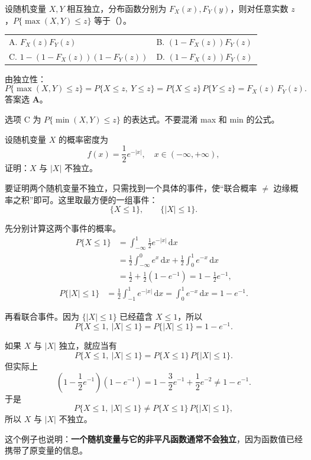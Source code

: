 ﻿\documentclass[lang=cn,11pt]{elegantbook}
\begin{document}
\begin{exercise}[独立性选择题] \label{exer:3-12d}
设随机变量 $X, Y$ 相互独立，分布函数分别为 $F_X(x), F_Y(y)$，则对任意实数 $z$，$P\{\max(X,Y) \leqslant z\}$ 等于（\quad）。\\
\begin{tabular}{ll}
A. $F_X(z)F_Y(z)$ & B. $(1-F_X(z))F_Y(z)$ \\
C. $1-(1-F_X(z))(1-F_Y(z))$ & D. $(1-F_X(z))F_Y(z)$
\end{tabular}
\end{exercise}
\begin{solution}
由独立性：
\[
P\{\max(X,Y) \leqslant z\} = P\{X \leqslant z,\ Y \leqslant z\} = P\{X \leqslant z\}\,P\{Y \leqslant z\} = F_X(z)\,F_Y(z).
\]
答案选 \textbf{A}。
\begin{note}
选项 C 为 $P\{\min(X,Y) \leqslant z\}$ 的表达式。不要混淆 max 和 min 的公式。
\end{note}
\end{solution}

\begin{exercise}[证明 $X$ 与 $|X|$ 不独立] \label{exer:3-5c}
设随机变量 $X$ 的概率密度为
\[
f(x) = \frac{1}{2}e^{-|x|}, \quad x \in (-\infty, +\infty),
\]
证明：$X$ 与 $|X|$ 不独立。
\end{exercise}
\begin{solution}
要证明两个随机变量不独立，只需找到一个具体的事件，使“联合概率 $\neq$ 边缘概率之积”即可。这里取最方便的一组事件：
\[
\{X\le 1\},\qquad \{|X|\le 1\}.
\]

先分别计算这两个事件的概率。
\[
\begin{aligned}
P\{X\le 1\}
&=\int_{-\infty}^1 \frac{1}{2}e^{-|x|}\,\mathrm{d}x \\
&=\frac{1}{2}\int_{-\infty}^{0} e^x\,\mathrm{d}x+\frac{1}{2}\int_{0}^{1} e^{-x}\,\mathrm{d}x \\
&=\frac{1}{2}+\frac{1}{2}(1-e^{-1})
=1-\frac{1}{2}e^{-1},
\end{aligned}
\]
\[
\begin{aligned}
P\{|X|\le 1\}
&=\frac{1}{2}\int_{-1}^{1}e^{-|x|}\,\mathrm{d}x
=\int_{0}^{1}e^{-x}\,\mathrm{d}x
=1-e^{-1}.
\end{aligned}
\]

再看联合事件。因为 $\{|X|\le 1\}$ 已经蕴含 $X\le 1$，所以
\[
P\{X\le 1,\ |X|\le 1\}=P\{|X|\le 1\}=1-e^{-1}.
\]

如果 $X$ 与 $|X|$ 独立，就应当有
\[
P\{X\le 1,\ |X|\le 1\}=P\{X\le 1\}\,P\{|X|\le 1\}.
\]
但实际上
\[
\left(1-\frac{1}{2}e^{-1}\right)(1-e^{-1})
=1-\frac{3}{2}e^{-1}+\frac{1}{2}e^{-2}
\neq 1-e^{-1}.
\]
于是
\[
P\{X\le 1,\ |X|\le 1\}\neq P\{X\le 1\}\,P\{|X|\le 1\},
\]
所以 $X$ 与 $|X|$ 不独立。

这个例子也说明：\textbf{一个随机变量与它的非平凡函数通常不会独立}，因为函数值已经携带了原变量的信息。
\end{solution}
\end{document}
